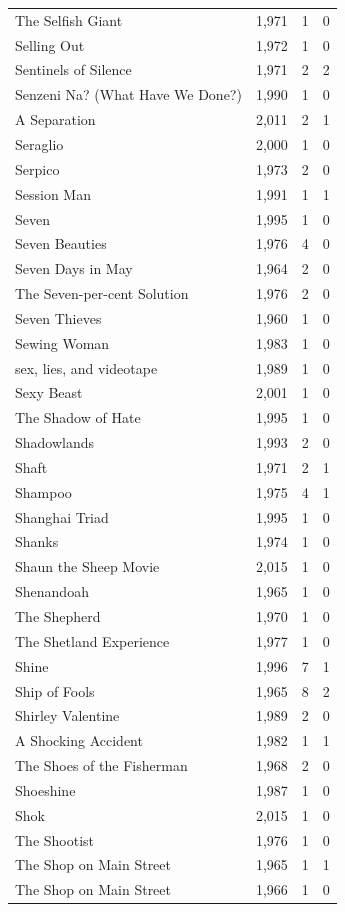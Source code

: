 \begin{tabular}{lrrr}
The Selfish Giant & 1,971 & 1 & 0 \\
Selling Out & 1,972 & 1 & 0 \\
Sentinels of Silence & 1,971 & 2 & 2 \\
Senzeni Na? (What Have We Done?) & 1,990 & 1 & 0 \\
A Separation & 2,011 & 2 & 1 \\
Seraglio & 2,000 & 1 & 0 \\
Serpico & 1,973 & 2 & 0 \\
Session Man & 1,991 & 1 & 1 \\
Seven & 1,995 & 1 & 0 \\
Seven Beauties & 1,976 & 4 & 0 \\
Seven Days in May & 1,964 & 2 & 0 \\
The Seven-per-cent Solution & 1,976 & 2 & 0 \\
Seven Thieves & 1,960 & 1 & 0 \\
Sewing Woman & 1,983 & 1 & 0 \\
sex, lies, and videotape & 1,989 & 1 & 0 \\
Sexy Beast & 2,001 & 1 & 0 \\
The Shadow of Hate & 1,995 & 1 & 0 \\
Shadowlands & 1,993 & 2 & 0 \\
Shaft & 1,971 & 2 & 1 \\
Shampoo & 1,975 & 4 & 1 \\
Shanghai Triad & 1,995 & 1 & 0 \\
Shanks & 1,974 & 1 & 0 \\
Shaun the Sheep Movie & 2,015 & 1 & 0 \\
Shenandoah & 1,965 & 1 & 0 \\
The Shepherd & 1,970 & 1 & 0 \\
The Shetland Experience & 1,977 & 1 & 0 \\
Shine & 1,996 & 7 & 1 \\
Ship of Fools & 1,965 & 8 & 2 \\
Shirley Valentine & 1,989 & 2 & 0 \\
A Shocking Accident & 1,982 & 1 & 1 \\
The Shoes of the Fisherman & 1,968 & 2 & 0 \\
Shoeshine & 1,987 & 1 & 0 \\
Shok & 2,015 & 1 & 0 \\
The Shootist & 1,976 & 1 & 0 \\
The Shop on Main Street & 1,965 & 1 & 1 \\
The Shop on Main Street & 1,966 & 1 & 0 \\

\end{tabular}
